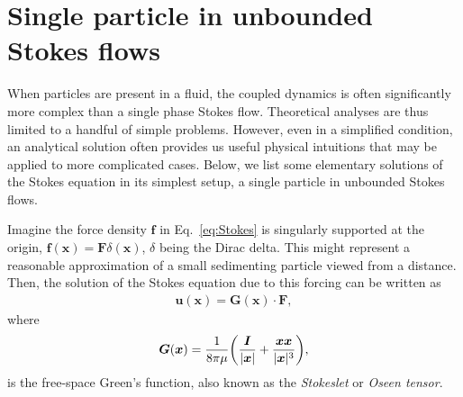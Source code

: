 \section{Single particle in unbounded Stokes flows}
\label{sec:single-p}

When particles are present in a fluid, the coupled dynamics is often significantly more complex than a single phase Stokes flow. Theoretical analyses are thus limited to a handful of simple problems. However, even in a simplified condition, an analytical solution often provides us useful physical intuitions that may be applied to more complicated cases. Below, we list some elementary solutions of the Stokes equation in its simplest setup, \ie a single particle in unbounded Stokes flows.

\bigskip
Imagine the force density ${\bm f}$ in Eq.\ \eqref{eq:Stokes} is singularly supported at the origin, \ie ${\bm f}({\bm x})={\bm F}\delta({\bm x})$, $\delta$ being the Dirac delta. This might represent a reasonable approximation of a small sedimenting particle viewed from a distance. Then, the solution of the Stokes equation due to this forcing can be written as
\begin{equation} \label{eq:stokes-green}
 \begin{aligned}
   {\bm u}({\bm x}) = {\bm G}({\bm x}) \cdot {\bm F},
 \end{aligned}
\end{equation}
where  
\begin{equation} \label{eq:stokeslet}
 \begin{aligned}
   {\bm G}({\bm x}) = \frac{1}{8\pi\mu } \bigg( \frac{{\bm I}}{\lvert\bm x\rvert}+\frac{ {\bm x}{\bm x} }{ \lvert{\bm x}\rvert^3 } \bigg),
 \end{aligned}
\end{equation}
is the free-space Green's function, also known as the \emph{Stokeslet} or \emph{Oseen tensor}.

